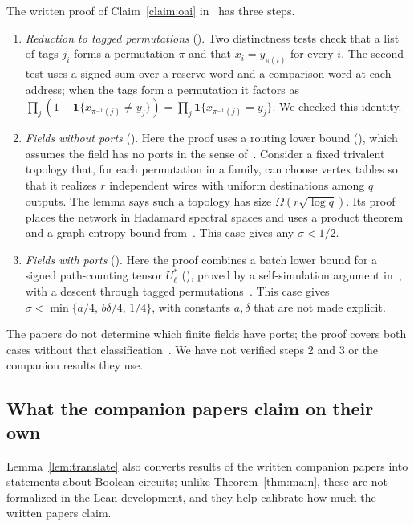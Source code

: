 \documentclass[11pt]{article}
\theoremstyle{definition}
\newcommand{\one}{\mathbf{1}}
\begin{document}
The written proof of Claim~\ref{claim:oai} in~\cite[Section~4]{OAI-MM} has three steps.
\begin{enumerate}
\item \emph{Reduction to tagged permutations} (\cite[Section~4.1]{OAI-MM}). Two distinctness tests check that a list of tags $j_i$ forms a permutation $\pi$ and that $x_i = y_{\pi(i)}$ for every $i$. The second test uses a signed sum over a reserve word and a comparison word at each address; when the tags form a permutation it factors as $\prod_j(1-\one\{x_{\pi^{-1}(j)}\neq y_j\}) = \prod_j \one\{x_{\pi^{-1}(j)}=y_j\}$. We checked this identity.
\item \emph{Fields without ports} (\cite[Section~4.2]{OAI-MM}). Here the proof uses a routing lower bound (\cite[Lemma~4.1]{OAI-MM}), which assumes the field has no ports in the sense of~\cite[Definition~11.1]{OAI-Euc}. Consider a fixed trivalent topology that, for each permutation in a family, can choose vertex tables so that it realizes $r$ independent wires with uniform destinations among $q$ outputs. The lemma says such a topology has size $\Omega(r\sqrt{\log q})$. Its proof places the network in Hadamard spectral spaces and uses a product theorem and a graph-entropy bound from~\cite[Theorem~6.1, Corollary~5.2]{OAI-HC}. This case gives any $\sigma<1/2$.
\item \emph{Fields with ports} (\cite[Section~4.3]{OAI-MM}). Here the proof combines a batch lower bound for a signed path-counting tensor $U_\ell^*$ (\cite[Theorem~12.1]{OAI-HC}), proved by a self-simulation argument in~\cite[Sections~13--15]{OAI-HC}, with a descent through tagged permutations~\cite[Proposition~14.1]{OAI-Euc}. This case gives $\sigma<\min\{a/4,\,b\delta/4,\,1/4\}$, with constants $a,\delta$ that are not made explicit.
\end{enumerate}
The papers do not determine which finite fields have ports; the proof covers both cases without that classification~\cite[Section~1.3]{OAI-HC}. We have not verified steps 2 and 3 or the companion results they use.

\subsection{What the companion papers claim on their own}\label{sec:companions}

Lemma~\ref{lem:translate} also converts results of the written companion papers into statements about Boolean circuits; unlike Theorem~\ref{thm:main}, these are not formalized in the Lean development, and they help calibrate how much the written papers claim.
\end{document}
